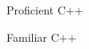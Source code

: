 

\begin{cvskills}

  \cvskill
    {Proficient} %
    {C++} %
    
  \cvskill
    {Familiar} %
    {C++} %

\end{cvskills}

